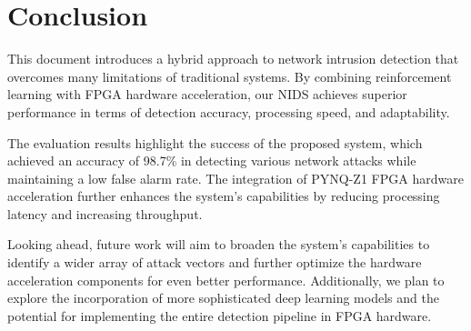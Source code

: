 \documentclass[12pt]{article}
\begin{document}
\section{Conclusion}
This document introduces a hybrid approach to network intrusion detection that overcomes many limitations of traditional systems. By combining reinforcement learning with FPGA hardware acceleration, our NIDS achieves superior performance in terms of detection accuracy, processing speed, and adaptability.

The evaluation results highlight the success of the proposed system, which achieved an accuracy of 98.7\% in detecting various network attacks while maintaining a low false alarm rate. The integration of PYNQ-Z1 FPGA hardware acceleration further enhances the system's capabilities by reducing processing latency and increasing throughput.

Looking ahead, future work will aim to broaden the system's capabilities to identify a wider array of attack vectors and further optimize the hardware acceleration components for even better performance. Additionally, we plan to explore the incorporation of more sophisticated deep learning models and the potential for implementing the entire detection pipeline in FPGA hardware.
\end{document}
